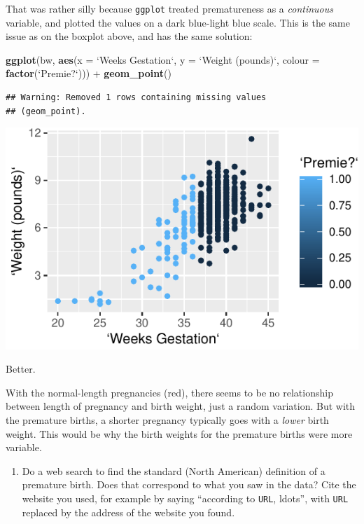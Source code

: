 \documentclass[]{tufte-book}
\newenvironment{Shaded}{}{}
\newcommand{\DataTypeTok}[1]{\textcolor[rgb]{0.56,0.13,0.00}{#1}}
\newcommand{\KeywordTok}[1]{\textcolor[rgb]{0.00,0.44,0.13}{\textbf{#1}}}
\newcommand{\NormalTok}[1]{#1}
\newcommand{\OperatorTok}[1]{\textcolor[rgb]{0.40,0.40,0.40}{#1}}
\newcommand{\StringTok}[1]{\textcolor[rgb]{0.25,0.44,0.63}{#1}}
\providecommand{\tightlist}{%
  \setlength{\itemsep}{0pt}\setlength{\parskip}{0pt}}
\theoremstyle{definition}
\theoremstyle{definition}
\theoremstyle{definition}
\theoremstyle{remark}
\begin{document}
That was rather silly because \texttt{ggplot} treated prematureness as a
\emph{continuous} variable, and plotted the values on a dark blue-light
blue scale. This is the same issue as on the boxplot above, and has the
same solution:

\begin{Shaded}
\begin{Highlighting}[]
\KeywordTok{ggplot}\NormalTok{(bw, }\KeywordTok{aes}\NormalTok{(}\DataTypeTok{x =} \StringTok{`}\DataTypeTok{Weeks Gestation}\StringTok{`}\NormalTok{, }\DataTypeTok{y =} \StringTok{`}\DataTypeTok{Weight (pounds)}\StringTok{`}\NormalTok{, }
    \DataTypeTok{colour =} \KeywordTok{factor}\NormalTok{(}\StringTok{`}\DataTypeTok{Premie?}\StringTok{`}\NormalTok{))) }\OperatorTok{+}\StringTok{ }\KeywordTok{geom_point}\NormalTok{()}
\end{Highlighting}
\end{Shaded}

\begin{verbatim}
## Warning: Removed 1 rows containing missing values
## (geom_point).
\end{verbatim}

\includegraphics{03-data-summaries_files/figure-latex/unnamed-chunk-24-1}

Better.

With the normal-length pregnancies (red), there seems to be no
relationship between length of pregnancy and birth weight, just a random
variation. But with the premature births, a shorter pregnancy typically
goes with a \emph{lower} birth weight. This would be why the birth
weights for the premature births were more variable.

\begin{enumerate}
\def\labelenumi{(\alph{enumi})}
\setcounter{enumi}{2}
\tightlist
\item
  Do a web search to find the standard (North American) definition of a
  premature birth. Does that correspond to what you saw in the data?
  Cite the website you used, for example by saying ``according to
  \texttt{URL}, ldots'', with \texttt{URL} replaced by the address of
  the website you found.
\end{enumerate}
\end{document}
